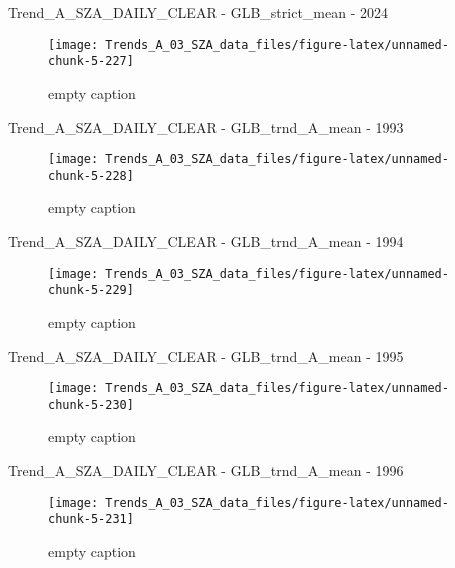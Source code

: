 \documentclass[
  10pt,
  a4paper,oneside]{article}
\begin{document}
Trend\_A\_SZA\_DAILY\_CLEAR - GLB\_strict\_mean - 2024

\begin{figure}[!ht]

{\centering \texttt{[image: Trends\_A\_03\_SZA\_data\_files/figure-latex/unnamed-chunk-5-227]} 

}

\caption{ empty caption }\label{fig:unnamed-chunk-5-227}
\end{figure}

Trend\_A\_SZA\_DAILY\_CLEAR - GLB\_trnd\_A\_mean - 1993

\begin{figure}[!ht]

{\centering \texttt{[image: Trends\_A\_03\_SZA\_data\_files/figure-latex/unnamed-chunk-5-228]} 

}

\caption{ empty caption }\label{fig:unnamed-chunk-5-228}
\end{figure}

Trend\_A\_SZA\_DAILY\_CLEAR - GLB\_trnd\_A\_mean - 1994

\begin{figure}[!ht]

{\centering \texttt{[image: Trends\_A\_03\_SZA\_data\_files/figure-latex/unnamed-chunk-5-229]} 

}

\caption{ empty caption }\label{fig:unnamed-chunk-5-229}
\end{figure}

Trend\_A\_SZA\_DAILY\_CLEAR - GLB\_trnd\_A\_mean - 1995

\begin{figure}[!ht]

{\centering \texttt{[image: Trends\_A\_03\_SZA\_data\_files/figure-latex/unnamed-chunk-5-230]} 

}

\caption{ empty caption }\label{fig:unnamed-chunk-5-230}
\end{figure}

Trend\_A\_SZA\_DAILY\_CLEAR - GLB\_trnd\_A\_mean - 1996

\begin{figure}[!ht]

{\centering \texttt{[image: Trends\_A\_03\_SZA\_data\_files/figure-latex/unnamed-chunk-5-231]} 

}

\caption{ empty caption }\label{fig:unnamed-chunk-5-231}
\end{figure}
\end{document}
